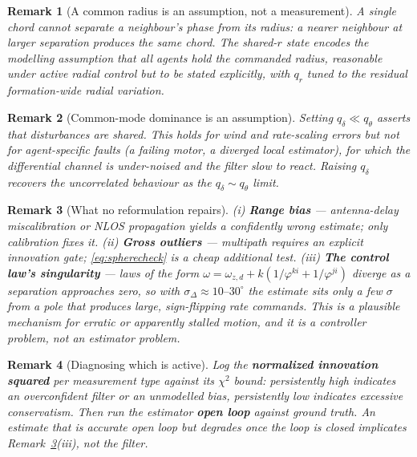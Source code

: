 \documentclass[11pt,a4paper]{article}
\newtheorem{remark}{Remark}
\begin{document}
\begin{remark}[A common radius is an assumption, not a measurement]
A single chord cannot separate a neighbour's phase from its radius: a nearer
neighbour at larger separation produces the same chord. The shared-$r$ state
encodes the modelling assumption that all agents hold the commanded radius,
reasonable under active radial control but to be stated explicitly, with $q_r$
tuned to the residual formation-wide radial variation.
\end{remark}

\begin{remark}[Common-mode dominance is an assumption]
Setting $q_\delta \ll q_\theta$ asserts that disturbances are shared. This holds
for wind and rate-scaling errors but not for agent-specific faults (a failing
motor, a diverged local estimator), for which the differential channel is
under-noised and the filter slow to react. Raising $q_\delta$ recovers the
uncorrelated behaviour as the $q_\delta \sim q_\theta$ limit.
\end{remark}

\begin{remark}[What no reformulation repairs]
\label{rem:notfixed}
\emph{(i)} \textbf{Range bias} --- antenna-delay miscalibration or NLOS
propagation yields a confidently wrong estimate; only calibration fixes it.
\emph{(ii)} \textbf{Gross outliers} --- multipath requires an explicit
innovation gate; \eqref{eq:spherecheck} is a cheap additional test.
\emph{(iii)} \textbf{The control law's singularity} --- laws of the form
$\omega = \omega_{z,d} + k(1/\varphi^{ki} + 1/\varphi^{ji})$ diverge as a
separation approaches zero, so with $\sigma_\Delta \approx 10\text{--}30^\circ$
the estimate sits only a few $\sigma$ from a pole that produces large,
sign-flipping rate commands. This is a plausible mechanism for erratic or
apparently stalled motion, and it is a \emph{controller} problem, not an
estimator problem.
\end{remark}

\begin{remark}[Diagnosing which is active]
Log the \textbf{normalized innovation squared} per measurement type against its
$\chi^2$ bound: persistently high indicates an overconfident filter or an
unmodelled bias, persistently low indicates excessive conservatism. Then run the
estimator \textbf{open loop} against ground truth. An estimate that is accurate
open loop but degrades once the loop is closed implicates
Remark~\ref{rem:notfixed}(iii), not the filter.
\end{remark}
\end{document}

